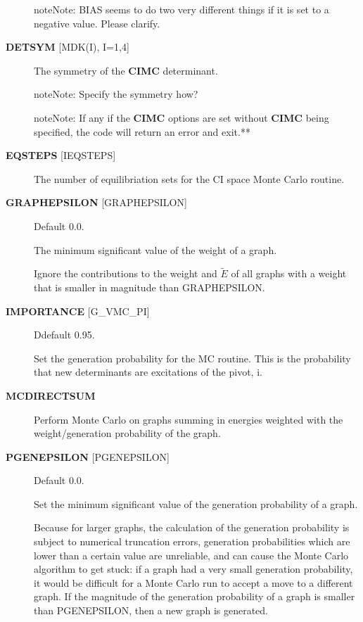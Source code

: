 \documentclass[openany,a4paper,10pt,english]{manual}
\begin{document}
\begin{description}
\begin{notice}{note}{Note:}
BIAS seems to do two very different things if it is set to a negative value.
Please clarify.
\end{notice}

\item[\textbf{DETSYM} {[}MDK(I), I=1,4{]}] \leavevmode
The symmetry of the \textbf{CIMC} determinant.

\begin{notice}{note}{Note:}
Specify the symmetry how?
\end{notice}

\begin{notice}{note}{Note:}
If any if the \textbf{CIMC} options are set without \textbf{CIMC} being
specified, the code will return an error and exit.**
\end{notice}

\item[\textbf{EQSTEPS} {[}IEQSTEPS{]}] \leavevmode
The number of equilibriation sets for the CI space Monte Carlo routine.

\item[\textbf{GRAPHEPSILON} {[}GRAPHEPSILON{]}] \leavevmode
Default 0.0.

The minimum significant value of the weight of a graph.

Ignore the contributions to the weight and $\tilde{E}$ of all
graphs with a weight that is smaller in magnitude than GRAPHEPSILON.

\item[\textbf{IMPORTANCE} {[}G\_VMC\_PI{]}] \leavevmode
Ddefault 0.95.

Set the generation probability for the MC routine.  This is the
probability that new determinants are excitations of the pivot, i.

\item[\textbf{MCDIRECTSUM}] \leavevmode
Perform Monte Carlo on graphs summing in energies weighted with the
weight/generation probability of the graph.

\item[\textbf{PGENEPSILON} {[}PGENEPSILON{]}] \leavevmode
Default 0.0.

Set the minimum significant value of the generation probability of a graph.

Because for larger graphs, the calculation of the generation
probability is subject to numerical truncation errors, generation
probabilities which are lower than a certain value are unreliable,
and can cause the Monte Carlo algorithm to get stuck: if a graph had a
very small generation probability, it would be difficult for a Monte
Carlo run to accept a move to a different graph.  If the magnitude
of the generation probability of a graph is smaller than PGENEPSILON,
then a new graph is generated.


\end{description}
\end{document}
